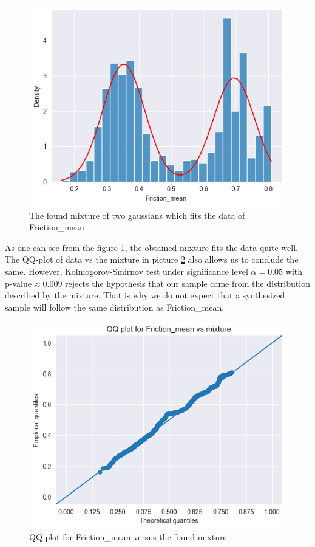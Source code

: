 \documentclass[12pt, bachelor, substylefile = algo_title.rtx]{disser}
\theoremstyle{definition}
\begin{document}
\begin{figure}[!h]
\centering
   \begin{minipage}{0.7\textwidth}
     \includegraphics[width=\linewidth]{estim}
   \end{minipage}
\caption{The found mixture of two gaussians which fits the data of Friction\_mean}
\label{fig: 3}
\end{figure}

As one can see from the figure \ref{fig: 3}, the obtained mixture fits the data quite well. The QQ-plot of data vs the mixture in picture \ref{fig: 4} also allows us to conclude the same. However, Kolmogorov-Smirnov test under significance level $\widetilde{\alpha} = 0.05$ with p-value$ \approx 0.009$ rejects the hypothesis that our sample came from the distribution described by the mixture. That is why we do not expect that a synthesized sample will follow the same distribution as Friction\_mean.

\begin{figure}[!h]
\centering
   \begin{minipage}{0.7\textwidth}
     \includegraphics[width=\linewidth]{qqmix}
   \end{minipage}
\caption{QQ-plot for Friction\_mean versus the found mixture}
\label{fig: 4}
\end{figure}
\end{document}
